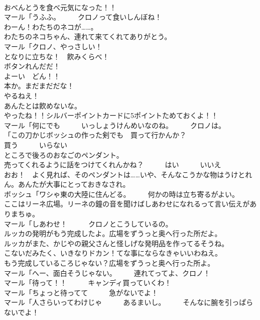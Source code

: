 \documentclass[8pt]{extreport}
\begin{document}
\begin{CJK}{UTF8}{min}
\\	おべんとうを食べ元気になった！！	
\\	マール「うふふ。　　　クロノって食いしんぼね！	
\\	わーん！わたちのネコが……。	
\\	わたちのネコちゃん、連れて来てくれてありがとう。	
\\	マール「クロノ、やっさしい！	
\\	となりに立ちな！　飮みくらべ！
\\	ボタンれんだだ！	
\\	よーい　どん！！	
\\	本か。まだまだだな！	
\\	やるねえ！	
\\	あんたとは飮めないな。	
\\	やったね！！シルバーポイントカードに5ポイントためておくよ！！	
\\	マール「何にでも　　　いっしょうけんめいなのね。　　　クロノは。	
\\	「この刀かじボッシュの作った剣でも　買って行かんか？	
\\	買う　　　いらない	
\\	ところで後ろのおなごのペンダント。	
\\	売ってくれるように話をつけてくれんかね？　　　はい　　　いいえ	
\\	おお！　よく見れば、そのペンダントは……いや、そんなこうかな物はうけとれん。あんたが大事にとっておきなされ。	
\\	ボッシュ「ワシゃ東の大陸に住んどる。　　　何かの時は立ち寄るがよい。	
\\	ここはリーネ広場。リーネの鐘の音を聞けばしあわせになれるって言い伝えがありまちゅ。	
\\	マール「しあわせ！　　　クロノとこうしているの。	
\\	ルッカの発明がもう完成したよ。広場をずうっと奥へ行った所だよ。	
\\	ルッカがまた、かじやの親父さんと怪しげな発明品を作ってるそうね。	
\\	こないだみたく、いきなりドカン！てな事にならなきゃいいわねえ。	
\\	もう完成しているころじゃない？広場をずうっと奥へ行った所よ。	
\\	マール「へー、面白そうじゃない。　　　連れてってよ、クロノ！	
\\	マール「待って！！　　　キャンディ買っていくわ！	
\\	マール「ちょっと待ってて　　　急がないでよ！	
\\	マール「人さらいってわけじゃ　　　あるまいし。　　　そんなに腕を引っぱらないでよ！	

\end{CJK}
\end{document}
